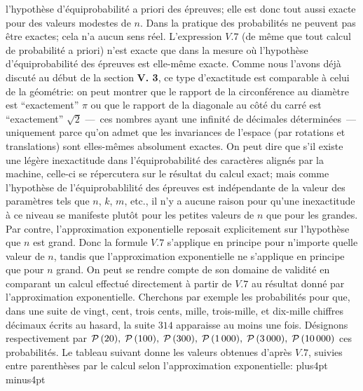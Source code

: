 l'hypoth\`ese  d'\'equiprobabilit\'e a priori des \'epreuves; elle est donc
tout aussi  exacte pour des valeurs modestes de $n$. Dans la pratique des
probabilit\'es ne peuvent pas \^etre exactes; cela n'a aucun sens r\'eel.
L'expression  $V.7$ (de m\^eme que tout calcul de probabilit\'e a priori)
n'est exacte que dans la mesure o\`u l'hypoth\`ese d'\'equiprobabilit\'e
des \'epreuves est elle-m\^eme exacte. Comme nous l'avons  d\'ej\`a
discut\'e au d\'ebut de la section {\bf V\ata . 3}, ce type d'exactitude est
comparable \`a celui  de la g\'eom\'etrie: on peut montrer que le rapport
de la circonf\'erence au diam\`etre est ``exactement'' $\pi$ ou que le
rapport de la dia\-go\-nale au c\^ot\'e du carr\'e est  ``exactement''
$\sqrt{2}$ ---~ces nombres ayant une  infinit\'e de d\'ecimales
d\'etermin\'ees~--- uniquement parce qu'on admet que les invariances 
de l'espace (par rotations et translations) sont elles-m\^emes 
absolument exactes.  
\medskip
On peut dire que s'il existe une l\'eg\`ere inexactitude dans 
l'\'equi\-pro\-ba\-bi\-lit\'e des carac\-t\`eres align\'es par la 
machine, celle-ci  se r\'epercutera sur le r\'esultat du calcul exact; 
mais comme l'hypoth\`ese de l'\'equiprobablilit\'e des \'epreuves est 
ind\'ependante  de la valeur des param\`etres tels que $n$, $k$, $m$, 
etc.,  il n'y a aucune raison pour  qu'une inexactitude \`a ce  niveau se
manifeste plut\^ot pour les petites valeurs de $n$ que pour  les grandes.
Par contre, l'approximation exponentielle reposait  explicitement sur 
l'hypoth\`ese que $n$ est grand. Donc la formule $V.7$ s'applique en
principe pour n'importe quelle valeur de $n$, tandis que l'approximation
exponentielle ne s'applique en principe que pour $n$ grand. On peut se
rendre compte de son domaine de validit\'e en comparant un calcul
effectu\'e directement \`a partir de  $V.7$ au r\'esultat donn\'e par
l'approximation exponentielle.  
\medskip
Cherchons par exemple les probabilit\'es pour que, dans une suite de 
vingt, cent, trois cents, mille, trois-mille,  et dix-mille chiffres
d\'ecimaux \'ecrits  au hasard, la suite $314$ apparaisse au moins une
fois. D\'esignons res\-pec\-ti\-ve\-ment par  ${\cal P}\, (20),\; {\cal
P}\,  (100),\; {\cal P}\, (300),\; {\cal P}\, (1\, 000),\; {\cal P}\, (3\,
000),\; {\cal P}\, (10\,  000)$ ces probabilit\'es. Le tableau suivant 
donne les valeurs obtenues d'apr\`es $V.7$, suivies entre parenth\`eses
par le calcul selon l'approximation exponentielle: 
\vskip 0pt plus4pt minus4pt 
